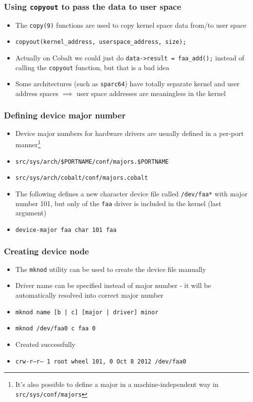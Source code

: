 \documentclass[dvipsnames,table]{beamer}
\begin{document}
\begin{frame}
\frametitle{Using {\tt copyout} to pass the data to user space}
\begin{itemize}
	\item The {\tt copy(9)} functions are used to copy kernel space data from/to user space
	\item {\tt copyout(kernel\_address, userspace\_address, size);}
	\item Actually on Cobalt we could just do {\tt *data->result = faa\_add();} instead of calling the {\tt copyout} function, but that is a bad idea
	\item Some architectures (such as {\tt sparc64}) have totally separate kernel and user address spaces $ \implies $ user space addresses are meaningless in the kernel

\end{itemize}
\end{frame}

\begin{frame}
\frametitle{Defining device major number}
\begin{itemize}
	\item Device major numbers for hardware drivers are usually defined in a per-port manner\footnote{It's also possible to define a major in a machine-independent way in {\tt src/sys/conf/majors}}
	\item {\tt src/sys/arch/\$PORTNAME/conf/majors.\$PORTNAME}
	\item {\tt src/sys/arch/cobalt/conf/majors.cobalt}
	\item The following defines a new character device file called {\tt /dev/faa*} with major number 101, but only of the {\tt faa} driver is included in the kernel (last argument)
	\item {\tt device-major faa char 101 faa}
\end{itemize}
\end{frame}

\begin{frame}
\frametitle{Creating device node}
\begin{itemize}
	\item The {\tt mknod} utility can be used to create the device file manually
	\item Driver name can be specified instead of major number - it will be automatically resolved into correct major number
	\item {\tt mknod name [b | c] [major | driver] minor}
	\item {\tt mknod /dev/faa0 c faa 0}
	\item Created successfully
	\scriptsize
	\item {\tt crw-r--r--  1 root  wheel  101, 0 Oct  8  2012 /dev/faa0}
	\normalsize
\end{itemize}
\end{frame}
\end{document}
